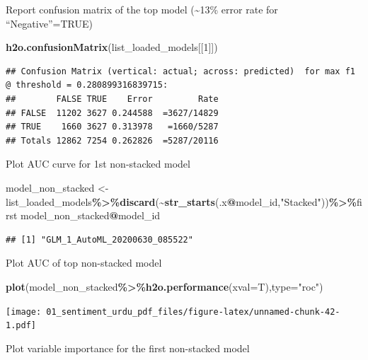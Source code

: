 \documentclass[
]{article}
\newenvironment{Shaded}{\begin{snugshade}}{\end{snugshade}}
\newcommand{\DataTypeTok}[1]{\textcolor[rgb]{0.13,0.29,0.53}{#1}}
\newcommand{\DecValTok}[1]{\textcolor[rgb]{0.00,0.00,0.81}{#1}}
\newcommand{\KeywordTok}[1]{\textcolor[rgb]{0.13,0.29,0.53}{\textbf{#1}}}
\newcommand{\NormalTok}[1]{#1}
\newcommand{\OperatorTok}[1]{\textcolor[rgb]{0.81,0.36,0.00}{\textbf{#1}}}
\newcommand{\StringTok}[1]{\textcolor[rgb]{0.31,0.60,0.02}{#1}}
\begin{document}
Report confusion matrix of the top model (\textasciitilde13\% error rate
for ``Negative''=TRUE)

\begin{Shaded}
\begin{Highlighting}[]
\KeywordTok{h2o.confusionMatrix}\NormalTok{(list\_loaded\_models[[}\DecValTok{1}\NormalTok{]])}
\end{Highlighting}
\end{Shaded}

\begin{verbatim}
## Confusion Matrix (vertical: actual; across: predicted)  for max f1 @ threshold = 0.280899316839715:
##        FALSE TRUE    Error         Rate
## FALSE  11202 3627 0.244588  =3627/14829
## TRUE    1660 3627 0.313978   =1660/5287
## Totals 12862 7254 0.262826  =5287/20116
\end{verbatim}

Plot AUC curve for 1st non-stacked model

\begin{Shaded}
\begin{Highlighting}[]
\NormalTok{model\_non\_stacked \textless{}{-}}\StringTok{ }\NormalTok{list\_loaded\_models}\OperatorTok{\%\textgreater{}\%}\KeywordTok{discard}\NormalTok{(}\OperatorTok{\textasciitilde{}}\KeywordTok{str\_starts}\NormalTok{(.x}\OperatorTok{@}\NormalTok{model\_id,}\StringTok{"Stacked"}\NormalTok{))}\OperatorTok{\%\textgreater{}\%}\NormalTok{first}
\NormalTok{model\_non\_stacked}\OperatorTok{@}\NormalTok{model\_id}
\end{Highlighting}
\end{Shaded}

\begin{verbatim}
## [1] "GLM_1_AutoML_20200630_085522"
\end{verbatim}

Plot AUC of top non-stacked model

\begin{Shaded}
\begin{Highlighting}[]
\KeywordTok{plot}\NormalTok{(model\_non\_stacked}\OperatorTok{\%\textgreater{}\%}\KeywordTok{h2o.performance}\NormalTok{(}\DataTypeTok{xval=}\NormalTok{T),}\DataTypeTok{type=}\StringTok{"roc"}\NormalTok{)}
\end{Highlighting}
\end{Shaded}

\texttt{[image: 01\_sentiment\_urdu\_pdf\_files/figure-latex/unnamed-chunk-42-1.pdf]}

Plot variable importance for the first non-stacked model
\end{document}
